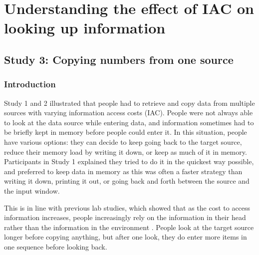 \documentclass[11pt,oneside]{report}
\begin{document}
\chapter{Understanding the effect of IAC on looking up information}

 
\section{Study 3: Copying numbers from one source}\label{ch:Study2}
\subsection{Introduction}
Study 1 and 2 illustrated that people had to retrieve and copy data from multiple sources with varying information access costs (IAC). People were not always able to look at the data source while entering data, and information sometimes had to be briefly kept in memory before people could enter it.
In this situation, people have various options: they can decide to keep going back to the target source, reduce their memory load by writing it down, or keep as much of it in memory. Participants in Study 1 explained they tried to do it in the quickest way possible, and preferred to keep data in memory as this was often a faster strategy than writing it down, printing it out, or going back and forth between the source and the input window.

This is in line with previous lab studies, which showed that as the cost to access information increases, people increasingly rely on the information in their head rather than the information in the environment \citep[e.g.][]{Gray2006, Morgan2009}. People look at the target source longer before copying anything, but after one look, they do enter more items in one sequence before looking back. 
\end{document}
